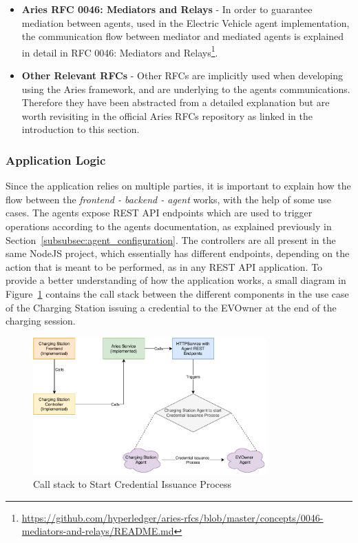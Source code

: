 \begin{itemize}
    \item \textbf{Aries RFC 0046: Mediators and Relays} - In order to guarantee mediation between agents, used in the Electric Vehicle agent implementation, the communication flow between mediator and mediated agents is explained in detail in RFC 0046: Mediators and Relays\footnote{\url{https://github.com/hyperledger/aries-rfcs/blob/master/concepts/0046-mediators-and-relays/README.md}}.
    \item \textbf{Other Relevant RFCs} - Other RFCs are implicitly used when developing using the Aries framework, and are underlying to the agents communications. Therefore they have been abstracted from a detailed explanation but are worth revisiting in the official Aries RFCs repository as linked in the introduction to this section.
\end{itemize}

\subsubsection{Application Logic}
\label{subsubsec:application_logic}

Since the application relies on multiple parties, it is important to explain how the flow between the \textit{frontend - backend - agent} works, with the help of some use cases. The agents expose REST API endpoints which are used to trigger operations according to the agents documentation, as explained previously in Section~\ref{subsubsec:agent_configuration}. The controllers are all present in the same NodeJS project, which essentially has different endpoints, depending on the action that is meant to be performed, as in any REST API application. To provide a better understanding of how the application works, a small diagram in Figure~\ref{fig:flow_of_credential_issuance} contains the call stack between the different components in the use case of the Charging Station issuing a credential to the EVOwner at the end of the charging session.

\begin{figure}[!htb]
    \centering
    \includegraphics[keepaspectratio=true, width=0.8\textwidth]{images/FlowOfCredentialIssuance.pdf}
    \caption{Call stack to Start Credential Issuance Process}
    \label{fig:flow_of_credential_issuance}
\end{figure}

